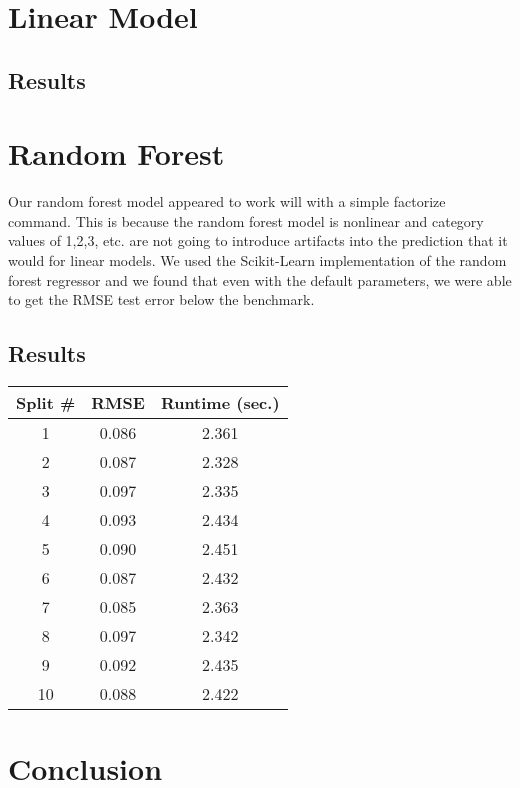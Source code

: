 \documentclass{article}
\begin{document}
\section{Linear Model}

\subsection{Results}

\section{Random Forest}

Our random forest model appeared to work will with a simple factorize command. This is because the random forest model is nonlinear and category values of 1,2,3, etc. are not going to introduce artifacts into the prediction that it would for linear models. We used the Scikit-Learn implementation of the random forest regressor and we found that even with the default parameters, we were able to get the RMSE test error below the benchmark.

\subsection{Results}


\begin{center} 
    \begin{tabular}{ | c |  c |  c |} 
        \hline
        Split \# & RMSE & Runtime (sec.) \\ 
        \hline\hline
        1 & 0.086 & 2.361 \\ 
        \hline 
        2 & 0.087 & 2.328 \\ 
        \hline 
        3 & 0.097 & 2.335 \\ 
        \hline 
        4 & 0.093 & 2.434 \\ 
        \hline 
        5 & 0.090 & 2.451 \\ 
        \hline 
        6 & 0.087 & 2.432 \\ 
        \hline
         7 & 0.085 & 2.363 \\ 
         \hline 
        8 & 0.097 & 2.342 \\ 
        \hline 
        9 & 0.092 & 2.435 \\ 
        \hline
        10 & 0.088 & 2.422 \\ 
        \hline 
    \end{tabular} 
\end{center}

\section{Conclusion}
\end{document}
